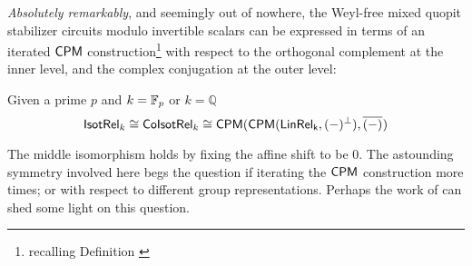 






{\em Absolutely remarkably}, and seemingly out of nowhere, the Weyl-free mixed quopit stabilizer circuits modulo invertible scalars can be expressed in terms of an iterated $\mathsf{CPM}$ construction\footnote{recalling Definition \cite{def:cpm}} with respect to the orthogonal complement at the inner level, and the complex conjugation at the outer level:
\begin{corollary}
Given a prime $p$ and $k=\mathbb{F}_p$ or $k=\mathbb{Q}$
$${\sf Isot}\mathsf{Rel}_{k}\cong{\sf Co}{\sf Isot}\mathsf{Rel}_{k}\cong \mathsf{CPM}(\mathsf{CPM}(\sf LinRel_{k},(-)^\perp),\overline{(-)}\hspace*{.01cm})$$
\end{corollary}
The middle isomorphism holds by fixing the affine shift to be $0$.
The astounding symmetry involved here begs the question if iterating the $\mathsf{CPM}$ construction more times; or with respect to different group representations. Perhaps the work of \cite{CPMho} can shed some light on this question. 

